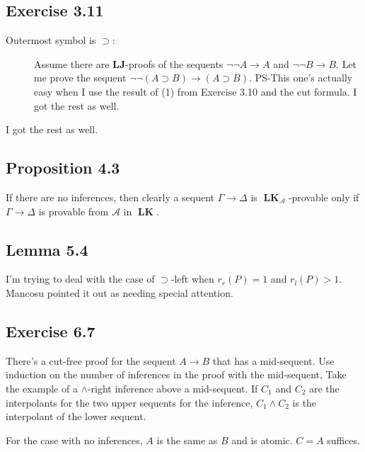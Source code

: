 \documentclass{article}
\DeclareMathOperator{\LK}{\textbf{LK}}
\def\fCenter{\mbox{\Large$\rightarrow$}}
\def\fCenter{\mbox{$\rightarrow$}}
\begin{document}
\subsection{Exercise 3.11}
    \begin{description}
        \item[Outermost symbol is \(\supset\):]
        Assume there are \textbf{LJ}-proofs of the sequents \(\neg\neg A \rightarrow A\)
        and \(\neg \neg B \rightarrow B\).
        Let me prove the sequent \(\neg \neg (A \supset B) \rightarrow (A \supset B)\).
        PS-This one's actually easy when I use the result of (1) from Exercise 3.10 and the cut formula.
        I got the rest as well.
    \end{description}
I got the rest as well.

\subsection{Proposition 4.3}
If there are no inferences, then clearly a sequent \(\Gamma \rightarrow \Delta\) is \(\LK_\mathcal{A}\)-provable
only if \(\Gamma \rightarrow \Delta\) is provable from \(\mathcal{A}\) in \(\LK\).

\subsection{Lemma 5.4}
I'm trying to deal with the case of \(\supset\)-left when  \(r_r(P) = 1\) and \(r_l(P) > 1\). Mancosu pointed it out as needing special attention.

\subsection{Exercise 6.7}
There's a cut-free proof for the sequent \(A \fCenter B\) that has a mid-sequent.
Use induction on the number of inferences in the proof with the mid-sequent, Take the example of
a \(\land\)-right inference above a mid-sequent. If \(C_1\) and \(C_2\) are the interpolants for the two
upper sequents for the inference, \(C_1 \land C_2\) is the interpolant of the lower sequent.

For the case with no inferences, \(A\) is the same as \(B\) and is atomic. \(C = A\) suffices.
\end{document}
